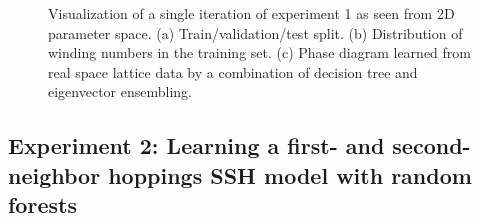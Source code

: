 \documentclass[10pt]{revtex4-1}
\begin{document}
\begin{figure}
\centering
{}\quad
{}
\caption{Visualization of a single iteration of experiment 1 as seen from 2D parameter space. (a) Train/validation/test split. (b) Distribution of winding numbers in the training set. (c) Phase diagram learned from real space lattice data by a combination of decision tree and eigenvector ensembling.}
\label{figexp1_exp}
\end{figure}

\subsection*{Experiment 2: Learning a first- and second-neighbor hoppings SSH model with random forests}
\label{exp2}
\end{document}
